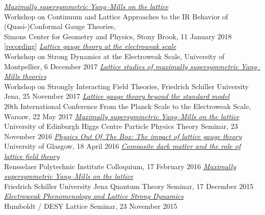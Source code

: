 \begin{spacelist}
\begin{revnumerate}
      \textit{\href{http://www.davidschaich.net/talks/1801StonyBrook.pdf}{Maximally supersymmetric Yang--Mills on the lattice}} \\
      Workshop on Continuum and Lattice Approaches to the IR Behavior of (Quasi-)Conformal Gauge Theories, \\ Simons Center for Geometry and Physics, Stony Brook, 11 January 2018 [\href{http://scgp.stonybrook.edu/video_portal/video.php?id=3516}{recording}]
    \pagebreakitem
      \textit{\href{http://www.davidschaich.net/talks/1712Montpellier.pdf}{Lattice gauge theory at the electroweak scale}} \\
      Workshop on Strong Dynamics at the Electroweak Scale, University of Montpellier, 6 December 2017
    \pagebreakitem
      \textit{\href{http://www.davidschaich.net/talks/1711Jena.pdf}{Lattice studies of maximally supersymmetric Yang--Mills theories}} \\
      Workshop on Strongly Interacting Field Theories, Friedrich Schiller University Jena, 25 November 2017
    \pagebreakitem
      \textit{\href{http://www.davidschaich.net/talks/1705Planck.pdf}{Lattice gauge theory beyond the standard model}} \\
      20th International Conference From the Planck Scale to the Electroweak Scale, Warsaw, 22 May 2017
    \pagebreakitem
      \textit{\href{http://www.davidschaich.net/talks/1611Edinburgh.pdf}{Maximally supersymmetric Yang--Mills on the lattice}} \\
      University of Edinburgh Higgs Centre Particle Physics Theory Seminar, 23 November 2016
    \pagebreakitem
      \textit{\href{http://www.davidschaich.net/talks/1604Glasgow.pdf}{Physics Out Of The Box: The impact of lattice gauge theory}} \\
      University of Glasgow, 18 April 2016
    \pagebreakitem
      \textit{\href{http://www.davidschaich.net/talks/1602RPI.pdf}{Composite dark matter and the role of lattice field theory}} \\
      Rensselaer Polytechnic Institute Colloquium, 17 February 2016
    \pagebreakitem
      \textit{\href{http://www.davidschaich.net/talks/1512Jena.pdf}{Maximally supersymmetric Yang--Mills on the lattice}} \\
      Friedrich Schiller University Jena Quantum Theory Seminar, 17 December 2015
    \pagebreakitem
      \textit{\href{http://www.davidschaich.net/talks/151123Humboldt.pdf}{Electroweak Phenomenology and Lattice Strong Dynamics}} \\
      Humboldt / DESY Lattice Seminar, 23 November 2015

\end{revnumerate}
\end{spacelist}
